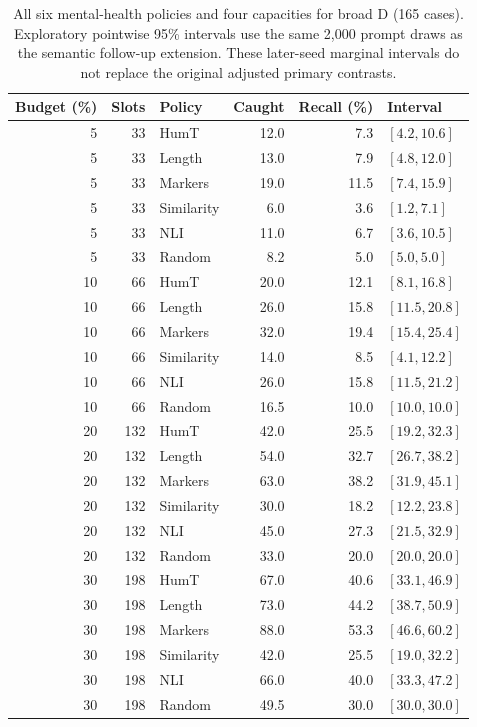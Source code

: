 \begin{table}[p]
\centering\footnotesize
\caption{All six mental-health policies and four capacities for broad D (165 cases). Exploratory pointwise 95\% intervals use the same 2,000 prompt draws as the semantic follow-up extension. These later-seed marginal intervals do not replace the original adjusted primary contrasts.}
\label{tab:broad_budget_all}
\begin{tabular}{rrlrrl}
\toprule
Budget (\%) & Slots & Policy & Caught & Recall (\%) & Interval \\
\midrule
5 & 33 & HumT & 12.0 & 7.3 & $[4.2, 10.6]$ \\
5 & 33 & Length & 13.0 & 7.9 & $[4.8, 12.0]$ \\
5 & 33 & Markers & 19.0 & 11.5 & $[7.4, 15.9]$ \\
5 & 33 & Similarity & 6.0 & 3.6 & $[1.2, 7.1]$ \\
5 & 33 & NLI & 11.0 & 6.7 & $[3.6, 10.5]$ \\
5 & 33 & Random & 8.2 & 5.0 & $[5.0, 5.0]$ \\
10 & 66 & HumT & 20.0 & 12.1 & $[8.1, 16.8]$ \\
10 & 66 & Length & 26.0 & 15.8 & $[11.5, 20.8]$ \\
10 & 66 & Markers & 32.0 & 19.4 & $[15.4, 25.4]$ \\
10 & 66 & Similarity & 14.0 & 8.5 & $[4.1, 12.2]$ \\
10 & 66 & NLI & 26.0 & 15.8 & $[11.5, 21.2]$ \\
10 & 66 & Random & 16.5 & 10.0 & $[10.0, 10.0]$ \\
20 & 132 & HumT & 42.0 & 25.5 & $[19.2, 32.3]$ \\
20 & 132 & Length & 54.0 & 32.7 & $[26.7, 38.2]$ \\
20 & 132 & Markers & 63.0 & 38.2 & $[31.9, 45.1]$ \\
20 & 132 & Similarity & 30.0 & 18.2 & $[12.2, 23.8]$ \\
20 & 132 & NLI & 45.0 & 27.3 & $[21.5, 32.9]$ \\
20 & 132 & Random & 33.0 & 20.0 & $[20.0, 20.0]$ \\
30 & 198 & HumT & 67.0 & 40.6 & $[33.1, 46.9]$ \\
30 & 198 & Length & 73.0 & 44.2 & $[38.7, 50.9]$ \\
30 & 198 & Markers & 88.0 & 53.3 & $[46.6, 60.2]$ \\
30 & 198 & Similarity & 42.0 & 25.5 & $[19.0, 32.2]$ \\
30 & 198 & NLI & 66.0 & 40.0 & $[33.3, 47.2]$ \\
30 & 198 & Random & 49.5 & 30.0 & $[30.0, 30.0]$ \\
\bottomrule
\end{tabular}
\end{table}
